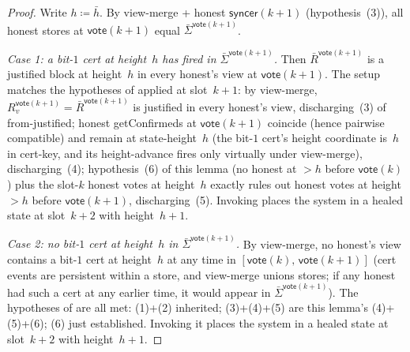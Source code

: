 \ifx\litemode\undefined\documentclass{article}\fi
\newcommand{\syncer}{\mathsf{syncer}}
\newcommand{\vote}{\mathsf{vote}}
\newcommand{\comm}[1]{\bar{#1}}
\newcommand{\getConfirmed}{\textsf{getConfirmed}\xspace}
\theoremstyle{plain}
\theoremstyle{definition}
\theoremstyle{remark}
\begin{document}
\begin{proof}
Write $h \coloneqq \comm{h}$. By view-merge + honest $\syncer(k+1)$ (hypothesis~(3)), all honest stores at $\vote(k+1)$ equal $\comm{\Sigma}^{\vote(k+1)}$.

\emph{Case 1: a bit-$1$ cert at height~$h$ has fired in $\comm{\Sigma}^{\vote(k+1)}$.}
Then $\comm{R}^{\vote(k+1)}$ is a justified block at height~$h$ in every honest's view at $\vote(k+1)$. The setup matches the hypotheses of  applied at slot~$k+1$: by view-merge, $R_v^{\vote(k+1)} = \comm{R}^{\vote(k+1)}$ is justified in every honest's view, discharging~(3) of from-justified; honest \getConfirmed{}s at $\vote(k+1)$ coincide (hence pairwise compatible) and remain at state-height~$h$ (the bit-$1$ cert's height coordinate is~$h$ in cert-key, and its height-advance fires only virtually under view-merge), discharging~(4); hypothesis~(6) of this lemma (no honest at $>h$ before $\vote(k)$) plus the slot-$k$ honest votes at height~$h$ exactly rules out honest votes at height $>h$ before $\vote(k+1)$, discharging~(5). Invoking  places the system in a healed state at slot~$k+2$ with height~$h+1$.

\emph{Case 2: no bit-$1$ cert at height~$h$ in $\comm{\Sigma}^{\vote(k+1)}$.}
By view-merge, no honest's view contains a bit-$1$ cert at height~$h$ at any time in $[\vote(k),\, \vote(k+1)]$ (cert events are persistent within a store, and view-merge unions stores; if any honest had such a cert at any earlier time, it would appear in $\comm{\Sigma}^{\vote(k+1)}$). The hypotheses of  are all met: (1)+(2) inherited; (3)+(4)+(5) are this lemma's (4)+(5)+(6); (6) just established. Invoking it places the system in a healed state at slot~$k+2$ with height~$h+1$.
\end{proof}
\end{document}

